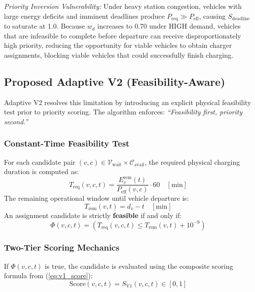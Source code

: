 \documentclass[conference]{IEEEtran}
\begin{document}
\emph{Priority Inversion Vulnerability:} Under heavy station congestion, vehicles with large energy deficits and imminent deadlines produce $P_{\mathrm{req}} \gg P_{\mathrm{eff}}$, causing $S_{\mathrm{deadline}}$ to saturate at 1.0. Because $w_d$ increases to 0.70 under HIGH demand, vehicles that are infeasible to complete before departure can receive disproportionately high priority, reducing the opportunity for viable vehicles to obtain charger assignments, blocking viable vehicles that could successfully finish charging.

\subsection{Proposed Adaptive V2 (Feasibility-Aware)}
Adaptive V2 resolves this limitation by introducing an explicit physical feasibility test prior to priority scoring. The algorithm enforces: \emph{``Feasibility first, priority second.''}

\subsubsection{Constant-Time Feasibility Test}
For each candidate pair $(v, c) \in \mathcal{V}_{\mathrm{wait}} \times \mathcal{C}_{\mathrm{avail}}$, the required physical charging duration is computed as:
\begin{equation}
T_{\mathrm{req}}(v, c, t) = \frac{E_v^{\mathrm{rem}}(t)}{P_{\mathrm{eff}}(v, c)} \cdot 60 \quad [\text{min}]
\label{eq:t_req}
\end{equation}
The remaining operational window until vehicle departure is:
\begin{equation}
T_{\mathrm{rem}}(v, t) = d_v - t \quad [\text{min}]
\label{eq:t_rem}
\end{equation}
An assignment candidate is strictly \textbf{feasible} if and only if:
\begin{equation}
\Phi(v, c, t) = \left( T_{\mathrm{req}}(v, c, t) \le T_{\mathrm{rem}}(v, t) + 10^{-9} \right)
\label{eq:feasibility}
\end{equation}

\subsubsection{Two-Tier Scoring Mechanics}
If $\Phi(v, c, t)$ is true, the candidate is evaluated using the composite scoring formula from (\ref{eq:v1_score}):
\begin{equation}
\mathrm{Score}(v, c, t) = S_{\mathrm{V1}}(v, c, t) \in [0, 1]
\end{equation}
\end{document}
